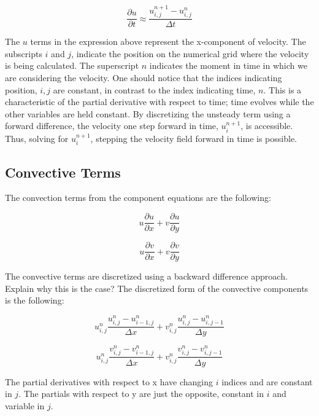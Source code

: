 \documentclass[twocolumn,12pth]{article}
\begin{document}
\begin{equation}
\frac{\partial{u}}{\partial{t}} \approx \frac{u_{i,j}^{n+1} - u_{i,j}^{n}}{\Delta{t}}
\end{equation}

The $u$ terms in the expression above represent the x-component of velocity.
The subscripts $i$ and $j$, indicate the position on the numerical grid where the velocity is being calculated.
The superscript $n$ indicates the moment in time in which we are considering the velocity.
One should notice that the indices indicating position, $i,j$ are constant, in contrast to the index indicating time, $n$.
This is a characteristic of the partial derivative with respect to time; time evolves while the other variables are held constant.
By discretizing the unsteady term using a forward difference, the velocity one step forward in time, $u_{i}^{n+1}$, is accessible.
Thus, solving for $u_{i}^{n+1}$, stepping the velocity field forward in time is possible.

\subsection{Convective Terms}

The convection terms from the component equations are the following:

\begin{equation}
u\frac{\partial{u}}{\partial{x}} + v\frac{\partial{u}}{\partial{y}}
\end{equation}

\begin{equation*}
u\frac{\partial{v}}{\partial{x}} + v\frac{\partial{v}}{\partial{y}}
\end{equation*}

The convective terms are discretized using a backward difference approach.
Explain why this is the case?
The discretized form of the convective components is the following:

\begin{equation}
u_{i,j}^n\frac{u^n_{i,j} - u^n_{i-1,j}}{\Delta{x}} + v_{i,j}^n\frac{u^n_{i,j} - u^n_{i,j-1}}{\Delta{y}}
\end{equation}

\begin{equation*}
u_{i,j}^n\frac{v^n_{i,j} - v^n_{i-1,j}}{\Delta{x}} + v_{i,j}^n\frac{v^n_{i,j} - v^n_{i,j-1}}{\Delta{y}}
\end{equation*}

The partial derivatives with respect to x have changing $i$ indices and are constant in $j$.
The partials with respect to y are just the opposite, constant in $i$ and variable in $j$.
\end{document}
